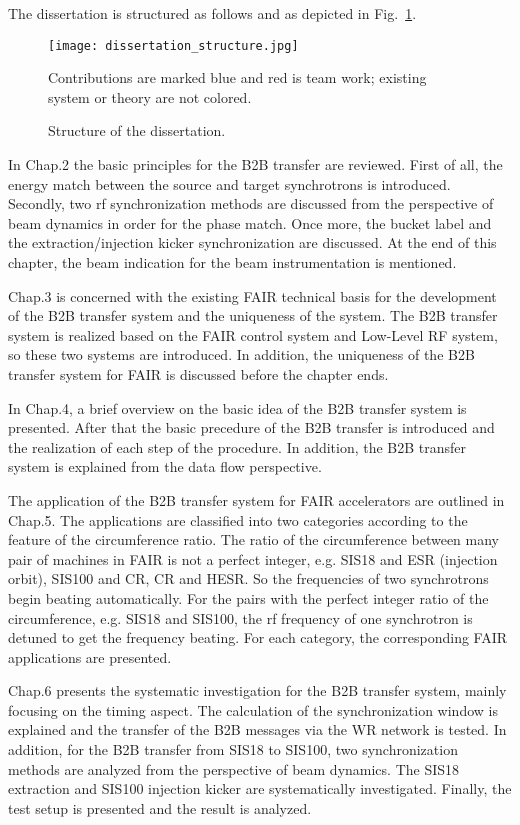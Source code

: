 The dissertation is structured as follows and as depicted in Fig.~\ref{dissertation_structure}.
\begin{figure}[!htb]
   \centering   
   \texttt{[image: dissertation\_structure.jpg]}
   \caption{Structure of the dissertation.}{Contributions are marked blue and red is team work; existing system or theory are not colored.}
   \label{dissertation_structure}
\end{figure}

In Chap.2 the basic principles for the B2B transfer are reviewed. First of all, the energy match between the source and target synchrotrons is introduced. Secondly, two rf synchronization methods are discussed from the perspective of beam dynamics in order for the phase match. Once more, the bucket label and the extraction/injection kicker synchronization are discussed. At the end of this chapter, the beam indication for the beam instrumentation is mentioned.

Chap.3 is concerned with the existing FAIR technical basis for the development of the B2B transfer system and the uniqueness of the system. The B2B transfer system is realized based on the FAIR control system and Low-Level RF system, so these two systems are introduced. In addition, the uniqueness of the B2B transfer system for FAIR is discussed before the chapter ends. 

In Chap.4, a brief overview on the basic idea of the B2B transfer system is presented. After that the basic precedure of the B2B transfer is introduced and the realization of each step of the procedure. In addition, the B2B transfer system is explained from the data flow perspective.

The application of the B2B transfer system for FAIR accelerators are outlined in Chap.5. The applications are classified into two categories according to the feature of the circumference ratio. The ratio of the circumference between many pair of machines in FAIR is not a perfect integer, e.g. SIS18 and ESR (injection orbit), SIS100 and CR, CR and HESR. So the frequencies of two synchrotrons begin beating automatically. For the pairs with the perfect integer ratio of the circumference, e.g. SIS18 and SIS100, the rf frequency of one synchrotron is detuned to get the frequency beating. For each category, the corresponding FAIR applications are presented. 

Chap.6 presents the systematic investigation for the B2B transfer system, mainly focusing on the timing aspect. The calculation of the synchronization window is explained and the transfer of the B2B messages via the WR network is tested. In addition, for the B2B transfer from SIS18 to SIS100, two synchronization methods are analyzed from the perspective of beam dynamics. The SIS18 extraction and SIS100 injection kicker are systematically investigated. Finally, the test setup is presented and the result is analyzed.

%
%
